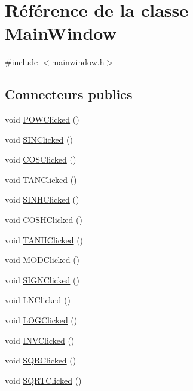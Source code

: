 \hypertarget{class_main_window}{\section{\-Référence de la classe \-Main\-Window}
\label{class_main_window}
}


{\ttfamily \#include $<$mainwindow.\-h$>$}

\subsection*{\-Connecteurs publics}
\begin{DoxyCompactItemize}
\item 
void \hyperlink{class_main_window_ab623e042d0384fce67ee67b86aa092ab}{\-P\-O\-W\-Clicked} ()
\item 
void \hyperlink{class_main_window_a694058b9993bdad7bf4c96b7bae1af37}{\-S\-I\-N\-Clicked} ()
\item 
void \hyperlink{class_main_window_acc7b69effe16bf3936be897b1e9697a2}{\-C\-O\-S\-Clicked} ()
\item 
void \hyperlink{class_main_window_abd6beb62d32cc0922fd78819e3c4a9cd}{\-T\-A\-N\-Clicked} ()
\item 
void \hyperlink{class_main_window_ae18b7a59154a29d9166dae53a02da0cd}{\-S\-I\-N\-H\-Clicked} ()
\item 
void \hyperlink{class_main_window_ae0cb839c1a84f68cfe7d55d75679bf32}{\-C\-O\-S\-H\-Clicked} ()
\item 
void \hyperlink{class_main_window_a9674367d1b35c2b7fcb37547982c7142}{\-T\-A\-N\-H\-Clicked} ()
\item 
void \hyperlink{class_main_window_a4edf9a5fcb637c43e2d4d4e107fd0c62}{\-M\-O\-D\-Clicked} ()
\item 
void \hyperlink{class_main_window_aada810f5e314c0180e159729f1af13f5}{\-S\-I\-G\-N\-Clicked} ()
\item 
void \hyperlink{class_main_window_a16e852b776efdec4876c32f0fb56a5b0}{\-L\-N\-Clicked} ()
\item 
void \hyperlink{class_main_window_a0e9e909347465ac2945668a5229c4688}{\-L\-O\-G\-Clicked} ()
\item 
void \hyperlink{class_main_window_a254c2a0ab491f878157d6abb8d4a8381}{\-I\-N\-V\-Clicked} ()
\item 
void \hyperlink{class_main_window_ad6048a7bb41b1e0ac37bb1f05e458cc8}{\-S\-Q\-R\-Clicked} ()
\item 
void \hyperlink{class_main_window_a40ff97255a9f62068bf20312468060dd}{\-S\-Q\-R\-T\-Clicked} ()

\end{DoxyCompactItemize}
